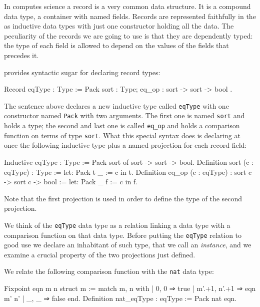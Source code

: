 In computes science a record is a very common data structure.  It is a
compound data type, a container with named fields.  Records are
represented faithfully in the \mcbCIC{} as
inductive data types with just one constructor holding all the data.
The peculiarity of the records we are going to use is that they are
dependently typed: the type of each field is allowed to depend on
the values of the fields that precedes it.

\Coq{} provides syntactic sugar for declaring record types:

\begin{coq}{}
Record eqType : Type := Pack {
  sort : Type;
  eq_op : sort -> sort -> bool
}.
\end{coq}

The sentence above declares a new inductive type called
\lstinline/eqType/ with one constructor named
\lstinline/Pack/ with two arguments.  The first one
is named \lstinline/sort/ and holds a type; the second and last
one is called \lstinline/eq_op/ and holds a comparison function
on terms of type \lstinline/sort/.  What this special syntax
does is declaring at once the following inductive type plus
a named projection for each record field:

\begin{coq}{}
Inductive eqType : Type :=
  Pack sort of sort -> sort -> bool.
Definition sort (c : eqType) : Type :=
  let: Pack t _ := c in t.
Definition eq_op (c : eqType) : sort c -> sort c -> bool :=
  let: Pack _ f := c in f.
\end{coq}

Note that the first projection is used in order to define the
type of the second projection.

We think of the \lstinline/eqType/ data type as a relation linking a
data type with a comparison function on that data type.  Before
putting the \lstinline/eqType/ relation to good use we declare an
inhabitant of such type, that we call an \emph{instance}, and we
examine a crucial property of the two projections just defined.

We relate the following comparison function with the \lstinline/nat/
data type: 

\begin{coq}{}
 Fixpoint eqn m n {struct m} :=
  match m, n with
  | 0, 0 ⇒ true
  | m'.+1, n'.+1 ⇒ eqn m' n'
  | _, _ ⇒ false
  end.
Definition nat_eqType : eqType := Pack nat eqn.
\end{coq}

